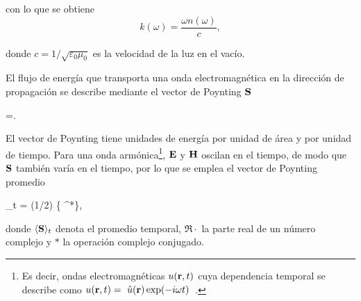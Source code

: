 \noindent con lo que se obtiene
%
\begin{equation}
	k(\omega) =\dfrac{\omega n(\omega)}{c},
	\label{eq:numero_onda} 
\end{equation}

\noindent donde $c=1/\sqrt{\varepsilon_0\mu_0}$ es la velocidad de la luz en el vacío.

El flujo de energía que transporta una onda electromagnética en la dirección de propagación se describe mediante el vector de Poynting  $\vb{S}$ \cite{griffithsIntroductionElectrodynamics2023}
\begin{tcolorbox}
	=\times{}.
	\label{eq:vect_Poynting} 
\end{tcolorbox}
\noindent El vector de Poynting tiene unidades de energía por unidad de área y por unidad de tiempo. Para una onda armónica\footnote{Es decir, ondas electromagnéticas $u(\vb{r},t)$ cuya dependencia temporal se describe como $u(\vb{r},t)=~\hat{u}(\vb{r})\,\text{exp}(-i\omega t)$~\cite{zangwillModernElectrodynamics2013}.}, $\vb{E}$ y $\vb{H}$ oscilan en el tiempo, de modo que $\vb{S}$ también varía en el tiempo, por lo que se emplea el vector de Poynting promedio \cite{bohrenAbsorptionScatteringLight2008}
\begin{tcolorbox}
	\langle{}\rangle_t = (1/2) \{ \times {}^*\},
	\label{eq:vect_Poynting_prom_arm} 
\end{tcolorbox}
\noindent donde $	\langle\vb{S}\rangle_t$ denota el promedio temporal, $\Re{\cdot}$ la parte real de un número complejo y $*$ la operación complejo conjugado. 












